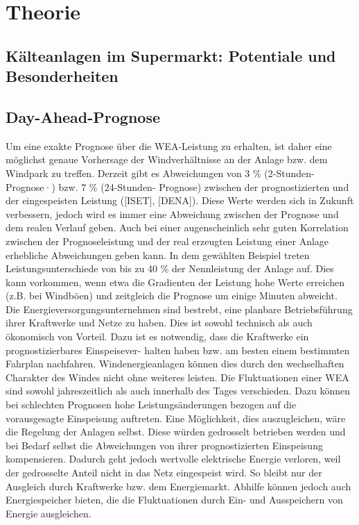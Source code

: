 \chapter{Theorie}
\label{chap:theorie}
\minitoc



\section{K\"alteanlagen im Supermarkt: Potentiale und Besonderheiten}

\section{Day-Ahead-Prognose}
Um eine exakte Prognose über die WEA-Leistung zu erhalten, ist daher eine möglichst genaue
Vorhersage der Windverhältnisse an der Anlage bzw. dem Windpark zu treffen.
Derzeit gibt es Abweichungen von 3 \% (2-Stunden-Prognose·) bzw. 7 \%
(24-Stunden- Prognose) zwischen der prognostizierten und der eingespeisten
Leistung ([ISET], [DENA]). Diese Werte werden sich in Zukunft verbessern, jedoch
wird es immer eine Abweichung zwischen der Prognose und dem realen Verlauf
geben. Auch bei einer augenscheinlich sehr guten Korrelation zwischen der
Prognoseleistung und der real erzeugten Leistung einer Anlage erhebliche
Abweichungen geben kann. In dem gewählten Beispiel treten Leistungsunterschiede
von bis zu 40 \% der Nennleistung der Anlage auf.  Dies kann vorkommen, wenn etwa
die Gradienten der Leistung hohe Werte erreichen (z.B. bei Windböen) und
zeitgleich die Prognose um einige Minuten abweicht.  Die
Energieversorgungsunternehmen sind bestrebt, eine planbare Betriebsführung ihrer
Kraftwerke und Netze zu haben. Dies ist sowohl technisch als auch ökonomisch von
Vorteil. Dazu ist es notwendig, dass die Kraftwerke ein prognostizierbares
Einspeisever- halten haben bzw. am besten einem bestimmten Fahrplan nachfahren.
Windenergieanlagen können dies durch den wechselhaften Charakter des Windes
nicht ohne weiteres leisten.  Die Fluktuationen einer WEA sind sowohl
jahreszeitlich als auch innerhalb des Tages verschieden. Dazu können bei
schlechten Prognosen hohe Leistungsänderungen bezogen auf die vorausgesagte
Einspeisung auftreten. Eine Möglichkeit, dies auszugleichen, wäre die Regelung
der Anlagen selbst. Diese würden gedrosselt betrieben werden und bei Bedarf
selbst die Abweichungen von ihrer prognostizierten Einspeisung kompensieren.
Dadurch geht jedoch wertvolle elektrische Energie verloren, weil der gedrosselte
Anteil nicht in das Netz eingespeist wird. So bleibt nur der Ausgleich durch
Kraftwerke bzw. dem Energiemarkt. Abhilfe können jedoch auch Energiespeicher
bieten, die die Fluktuationen durch Ein- und Ausspeichern von Energie
ausgleichen. 
